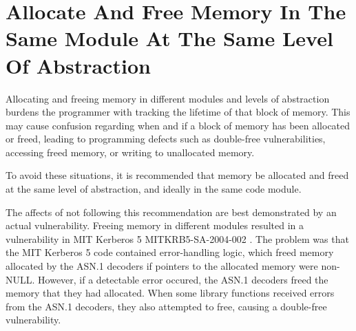 %
%

\section{Allocate And Free Memory In The Same Module At The Same Level Of Abstraction}
\label{AllocateAndFreeMemoryInTheSameModule::overview}

Allocating and freeing memory in different modules and levels of abstraction
burdens the programmer with tracking the lifetime of that block of memory. This
may cause confusion regarding when and if a block of memory has been allocated
or freed, leading to programming defects such as double-free vulnerabilities,
accessing freed memory, or writing to unallocated memory.

To avoid these situations, it is recommended that memory be allocated and freed
at the same level of abstraction, and ideally in the same code module.

The affects of not following this recommendation are best demonstrated by an
actual vulnerability. Freeing memory in different modules resulted in a
vulnerability in MIT Kerberos 5 MITKRB5-SA-2004-002 . The problem was that the
MIT Kerberos 5 code contained error-handling logic, which freed memory allocated
by the ASN.1 decoders if pointers to the allocated memory were non-NULL.
However, if a detectable error occured, the ASN.1 decoders freed the memory that
they had allocated. When some library functions received errors from the ASN.1
decoders, they also attempted to free, causing a double-free vulnerability.

